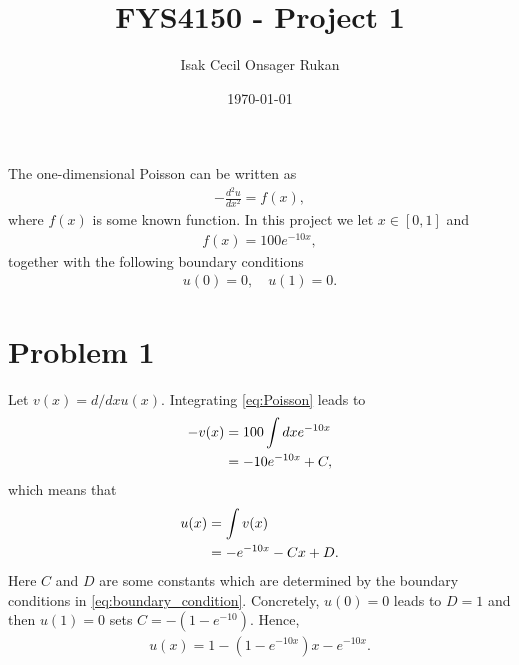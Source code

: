 \documentclass[english,notitlepage,reprint,nofootinbib]{revtex4-2}  %
\begin{document}
\title{FYS4150 - Project 1}  %
\author{Isak Cecil Onsager Rukan} %
\date{\today}                             %
\noaffiliation                            %
\maketitle
The one-dimensional Poisson can be written as 
\begin{align}
    -\frac{d^2u}{dx^2} = f(x),  \label{eq:Poisson}
\end{align}
where $f(x)$ is some known function. In this project we let \(x\in[0,1]\) and
\begin{align}
    f(x) = 100e^{-10x}, \label{eq:f_x}
\end{align}
together with the following boundary conditions
\begin{align}
    u(0)=0, \quad u(1)=0. \label{eq:boundary_condition}
\end{align}
\section{Problem 1}
Let $v(x)=d/dx u(x)$. Integrating \eqref{eq:Poisson} leads to 
\begin{align}
    -v(x) &= 100\int dxe^{-10x}
    \notag \\
    &= -10e^{-10x} + C,
\end{align}
which means that 
\begin{align}
    u(x) &= \int v(x) 
    \notag \\
    &= -e^{-10x} - Cx + D.
\end{align}
Here $C$ and $D$ are some constants which are determined by the boundary conditions in \eqref{eq:boundary_condition}. Concretely, \(u(0)=0\) leads to $D=1$ and then \(u(1)=0\) sets \(C=-(1-e^{-10})\). Hence,
\begin{align}
    u(x) = 1 - (1 - e^{-10x})x - e^{-10x}.  \label{eq:u_x}
\end{align}
\end{document}
